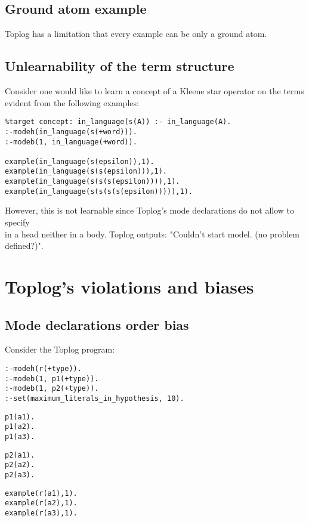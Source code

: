 \subsection{Ground atom example}
Toplog has a limitation that every example can be only a ground atom.

\subsection{Unlearnability of the term structure}\label{toplog_unlearnability_of_term_structure}
Consider one would like to learn a concept of a Kleene star operator on the terms evident from the following examples:
\begin{lstlisting}
%target concept: in_language(s(A)) :- in_language(A).
:-modeh(in_language(s(+word))).
:-modeb(1, in_language(+word)).

example(in_language(s(epsilon)),1).
example(in_language(s(s(epsilon))),1).
example(in_language(s(s(s(epsilon)))),1).
example(in_language(s(s(s(s(epsilon))))),1).
\end{lstlisting}

However, this is not learnable since Toplog's mode declarations do not allow to specify\\
 in a head neither in a body. Toplog outputs:
"Couldn't start model. (no problem defined?)".


\section{Toplog's violations and biases}
\subsection{Mode declarations order bias}\label{toplog_mode_declarations_order_bias}
Consider the Toplog program:

\begin{minipage}[t]{.35\textwidth}
\begin{lstlisting}
:-modeh(r(+type)).
:-modeb(1, p1(+type)).
:-modeb(1, p2(+type)).
:-set(maximum_literals_in_hypothesis, 10).
\end{lstlisting}
\end{minipage}
\begin{minipage}[t]{.20\textwidth}
\begin{lstlisting}
p1(a1).
p1(a2).
p1(a3).
\end{lstlisting}
\end{minipage}
\begin{minipage}[t]{.20\textwidth}
\begin{lstlisting}
p2(a1).
p2(a2).
p2(a3).
\end{lstlisting}
\end{minipage}
\begin{minipage}[t]{.25\textwidth}
\begin{lstlisting}
example(r(a1),1).
example(r(a2),1).
example(r(a3),1).
\end{lstlisting}
\end{minipage}


